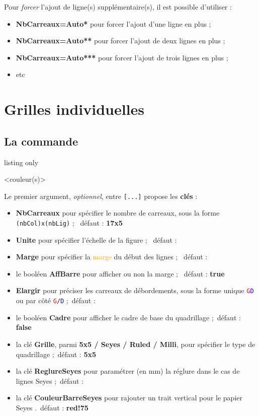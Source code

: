 \documentclass[a4paper]{article}
\newcommand\Cle[1]{{\bfseries\sffamily\textlangle #1\textrangle}}
\begin{document}
Pour \textit{forcer} l'ajout de ligne(s) supplémentaire(s), il est possible d'utiliser :

\begin{itemize}
	\item \Cle{NbCarreaux=Auto*} pour forcer l'ajout d'une ligne en plus ;
	\item \Cle{NbCarreaux=Auto**} pour forcer l'ajout de deux lignes en plus ;
	\item \Cle{NbCarreaux=Auto***} pour forcer l'ajout de trois lignes en plus ;
	\item etc
\end{itemize}

\pagebreak

\section{Grilles individuelles}

\subsection{La commande}

\begin{PresentationCode}{listing only}

\AffQuadrillage[clés]<couleur(s)>
\end{PresentationCode}

Le premier argument, \textit{optionnel}, entre \texttt{[...]} propose les \Cle{clés} :

\begin{itemize}
	\item \Cle{NbCarreaux} pour spécifier le nombre de carreaux, sous la forme \texttt{(nbCol)x(nbLig)} ; \hfill~défaut : \Cle{17x5}
	\item \Cle{Unite} pour spécifier l'échelle de la figure ; \hfill~défaut : \Cle{1}
	\item \Cle{Marge} pour spécifier la \textcolor{orange}{marge} du début des lignes ; \hfill~défaut : \Cle{0}
	\item le booléen \Cle{AffBarre} pour afficher ou non la marge ; \hfill~défaut : \Cle{true}
	\item \Cle{Elargir} pour préciser les carreaux de débordements, sous la forme unique \texttt{\textcolor{red}{G}\textcolor{blue}{D}} ou par côté \texttt{\textcolor{red}{G}/\textcolor{blue}{D}} ;\hfill~défaut : \Cle{0}
	\item le booléen \Cle{Cadre} pour afficher le cadre de base du quadrillage ;\hfill~défaut : \Cle{false}
	\item la clé \Cle{Grille}, parmi \Cle{5x5 / Seyes / Ruled / Milli}, pour spécifier le type de quadrillage ;\hfill~défaut : \Cle{5x5}
	\item la clé \Cle{ReglureSeyes} pour paramétrer (en mm) la réglure dans le cas de lignes Seyes ;\hfill~défaut : \Cle{2}
	\item la clé \Cle{CouleurBarreSeyes} pour rajouter un trait vertical pour le papier Seyes .\hfill~défaut : \Cle{red!75}
\end{itemize}
\end{document}

